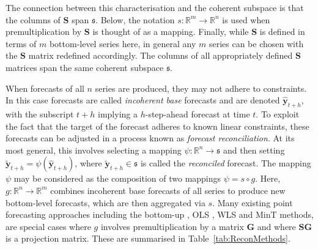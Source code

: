 \documentclass[11pt]{article}
\theoremstyle{definition}
\begin{document}
The connection between this characterisation and the coherent subspace is that the columns of $\bm{S}$ span $\mathfrak{s}$. Below, the notation $s:\mathbb{R}^m\rightarrow\mathbb{R}^n$ is used when premultiplication by $\bm{S}$ is thought of as a mapping. Finally, while $\bm{S}$ is defined in terms of $m$ bottom-level series here, in general any $m$ series can be chosen with the $\bm{S}$ matrix redefined accordingly. The columns of all appropriately defined $\bm{S}$ matrices span the same coherent subspace $\mathfrak{s}$.

When forecasts of all $n$ series are produced, they may not adhere to constraints. In this case forecasts are called \emph{incoherent base} forecasts and are denoted $\hat{\bm{y}}_{t+h}$, with the subscript $t+h$ implying a $h$-step-ahead forecast at time $t$. To exploit the fact that the target of the forecast adheres to known linear constraints, these forecasts can be adjusted in a process known as \emph{forecast reconciliation}. At its most general, this involves selecting a mapping $\psi:\mathbb{R}^n\rightarrow\mathfrak{s}$ and then setting $\tilde{\bm{y}}_{t+h}=\psi(\hat{\bm{y}}_{t+h})$, where $\tilde{\bm{y}}_{t+h}\in\mathfrak{s}$ is called the \emph{reconciled} forecast. The mapping $\psi$ may be considered as the composition of two mappings $\psi=s\circ g$. Here, $g:\mathbb{R}^{n}\rightarrow\mathbb{R}^{m}$ combines incoherent base forecasts of all series to produce new bottom-level forecasts, which are then aggregated via $s$. Many existing point forecasting approaches including the bottom-up \citep{Dunn1976}, OLS \citep{HynEtAl2011}, WLS \citep[][]{Hyndman2016,AthEtAl2017} and MinT \citep{WicEtAl2019} methods, are special cases where $g$ involves premultiplication by a matrix $\bm{G}$ and where $\bm{S}\bm{G}$ is a projection matrix. These are summarised in Table~\ref{tab:ReconMethods}.
\end{document}
